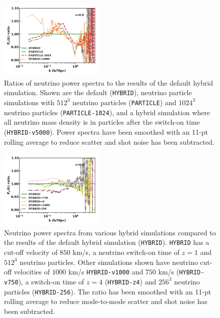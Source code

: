 \documentclass[useAMS, usenatbib]{mnras}
\begin{document}
\begin{figure}
  \includegraphics[width=0.45\textwidth]{nuplots/pks_nu_ckrel2-1.pdf}
    \caption{Ratios of neutrino power spectra to the results of the default hybrid simulation. Shown are the default (\texttt{HYBRID}), neutrino particle simulations with $512^3$ neutrino particles (\texttt{PARTICLE}) and $1024^3$ neutrino particles (\texttt{PARTICLE-1024}), and a hybrid simulation where all neutrino mass density is in particles after the switch-on time (\texttt{HYBRID-v5000}). Power spectra have been smoothed with an 11-pt rolling average to reduce scatter and shot noise has been subtracted.}
  \label{fig:hybparticle}
\end{figure}

\begin{figure}
  \includegraphics[width=0.45\textwidth]{nuplots/pks_nu_ckrel-1.pdf}
  \caption{Neutrino power spectra from various hybrid simulations compared to the results of the default hybrid simulation (\texttt{HYBRID}). \texttt{HYBRID} has a cut-off velocity of $850$ km/s, a neutrino switch-on time of $z=1$ and $512^3$ neutrino particles. Other simulations shown have neutrino cut-off velocities of $1000$ km/s \texttt{HYBRID-v1000} and $750$ km/s (\texttt{HYBRID-v750}), a switch-on time of $z=4$  (\texttt{HYBRID-z4}) and $256^3$ neutrino particles (\texttt{HYBRID-256}). The ratio has been smoothed with an 11-pt rolling average to reduce mode-to-mode scatter and shot noise has been subtracted.}
  \label{fig:vcrit}
\end{figure}
\end{document}
